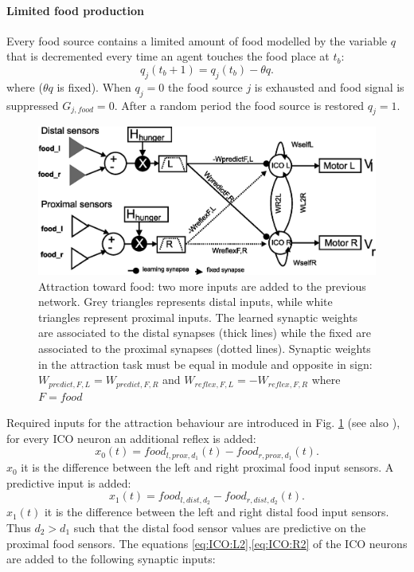 \paragraph{Limited food production}
Every food source contains a limited amount of food modelled by the variable $q$ that
 is decremented every time an agent touches the food place at $t_{b}$:
\begin{equation}
q_{j}(t_{b}+1)=q_{j}(t_{b})-\theta q.
\label{eq:qfood}
\end{equation}
where ($\theta q$ is fixed).
When $q_{j}=0$ the food source $j$ is exhausted and food signal is suppressed $G_{j,food}=0$.
After a random period the food source is restored $q_{j}=1$.
\begin{figure}[htb]
\includegraphics[scale=0.4]{figures/socialadapt/attractionFood.eps}
\vspace*{4pt}
\small{
\caption[Attraction learning behaviour for food]{Attraction toward food:
two more inputs are added to the previous network. Grey triangles represents
distal inputs, while white triangles represent proximal inputs.
The learned synaptic weights are associated to the distal synapses (thick lines)
 while the fixed are associated to the proximal synapses (dotted lines).
Synaptic weights in the attraction task must be equal in module and opposite
in sign: $W_{predict,F,L}=W_{predict,F,R}$ and $W_{reflex,F,L}=-W_{reflex,F,R}$
where $F=food$ \label{fig:attraction}}
}
\end{figure}

Required inputs for the attraction behaviour are introduced in
Fig. \ref{fig:attraction} (see also \citep{Stamm2006}),
for every ICO neuron an additional reflex is added:
\begin{equation}
x_{0}(t)=food_{l,prox,d_{1}}(t)-food_{r,prox,d_{1}}(t).
\end{equation}
$x_{0}$ it is the difference between the left and right proximal food input sensors.
A predictive input is added:
\begin{equation}
x_{1}(t)=food_{l,dist,d_{2}}-food_{r,dist,d_{2}}(t).
\end{equation}
$x_{1}(t)$ it is the difference between the left and right distal food input sensors.
Thus $d_{2}>d_{1}$ such that the distal food sensor values are
predictive on the proximal food sensors.
The equations \ref{eq:ICO:L2},\ref{eq:ICO:R2} of the ICO neurons are added to the
following synaptic inputs:

